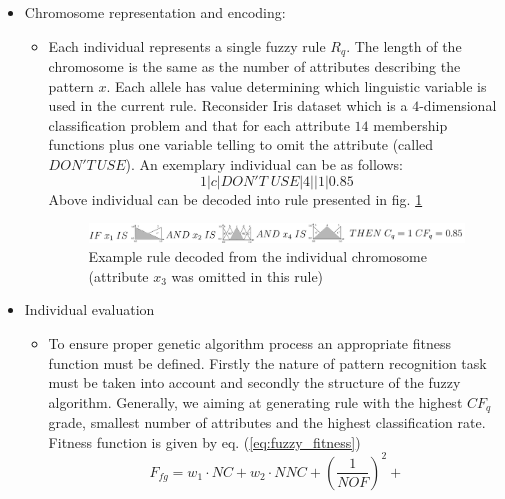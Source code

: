 \begin{itemize}
    \item Chromosome representation and encoding: 
        \begin{itemize}
            \item Each individual represents a single fuzzy rule $R_q$.
                The length of the chromosome is the same as the number of 
                attributes describing the pattern $x$. Each allele has value
                determining which linguistic variable is used in the current
                rule. Reconsider Iris dataset which is a $4$-dimensional
                classification problem and that for each attribute $14$
                membership functions plus one variable telling to omit the
                attribute (called $DON'T \,USE$). An exemplary individual can be as follows:
                $$1|c|DON'T \;USE|4||1|0.85$$
                Above individual can be decoded into rule presented in fig.
                \ref{fig:fuzzy_rule}
                \begin{figure}[H]
                    \begin{center}
                        \includegraphics[width=\textwidth]{fig/fuzzy_rule.png}
                    \end{center}
                    \caption{Example rule decoded from the individual
                    chromosome (attribute $x_3$ was omitted in this rule)}
                    \label{fig:fuzzy_rule}
                \end{figure}  
        \end{itemize}
    \item Individual evaluation
        \begin{itemize}
            \item To ensure proper genetic algorithm process an appropriate
                fitness function must be defined. Firstly the nature of pattern
                recognition task must be taken into account and secondly the
                structure of the fuzzy algorithm. Generally, we aiming at
                generating rule with the highest $CF_q$ grade, smallest number
                of attributes and the highest classification rate. Fitness
                function is given by eq. (\ref{eq:fuzzy_fitness})
                \begin{equation}
                    F_{fg} = w_1\cdot NC + w_2\cdot NNC + (\frac{1}{NOF})^2 +

\end{equation}
\end{itemize}
\end{itemize}
